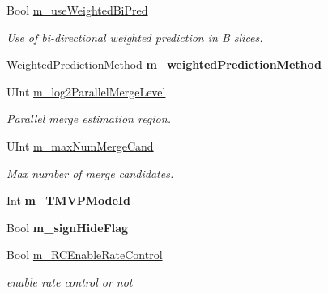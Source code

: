 \begin{DoxyCompactItemize}
\mbox{\label{class_t_app_enc_cfg_a59fbc838828d5014e1ed0f0b28f45711}} 
Bool \hyperlink{class_t_app_enc_cfg_a59fbc838828d5014e1ed0f0b28f45711}{m\+\_\+use\+Weighted\+Bi\+Pred}
\begin{DoxyCompactList}\small\item\em Use of bi-\/directional weighted prediction in B slices. \end{DoxyCompactList}\item 
\mbox{\label{class_t_app_enc_cfg_a09b1363fa3627b8a47c3969026788a39}} 
Weighted\+Prediction\+Method {\bfseries m\+\_\+weighted\+Prediction\+Method}
\item 
\mbox{\label{class_t_app_enc_cfg_a2f542c92d36cb051bdfb98bc383e4d00}} 
U\+Int \hyperlink{class_t_app_enc_cfg_a2f542c92d36cb051bdfb98bc383e4d00}{m\+\_\+log2\+Parallel\+Merge\+Level}
\begin{DoxyCompactList}\small\item\em Parallel merge estimation region. \end{DoxyCompactList}\item 
\mbox{\label{class_t_app_enc_cfg_ab9b7958c13388b17e297d4a3b1e49fb6}} 
U\+Int \hyperlink{class_t_app_enc_cfg_ab9b7958c13388b17e297d4a3b1e49fb6}{m\+\_\+max\+Num\+Merge\+Cand}
\begin{DoxyCompactList}\small\item\em Max number of merge candidates. \end{DoxyCompactList}\item 
\mbox{\label{class_t_app_enc_cfg_a942da7fcc4d6e77aafb74e8fa38d6c3d}} 
Int {\bfseries m\+\_\+\+T\+M\+V\+P\+Mode\+Id}
\item 
\mbox{\label{class_t_app_enc_cfg_ab5537b14c84ca59c15d23fcccb1e9446}} 
Bool {\bfseries m\+\_\+sign\+Hide\+Flag}
\item 
\mbox{\label{class_t_app_enc_cfg_a961f463a0465431bde05df77123ffa07}} 
Bool \hyperlink{class_t_app_enc_cfg_a961f463a0465431bde05df77123ffa07}{m\+\_\+\+R\+C\+Enable\+Rate\+Control}
\begin{DoxyCompactList}\small\item\em enable rate control or not \end{DoxyCompactList}\item 

\end{DoxyCompactItemize}
